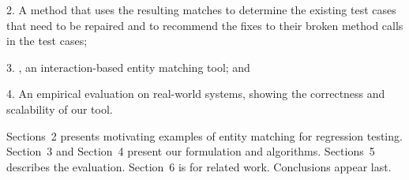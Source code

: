 2. A method that uses the resulting matches 
to determine the existing test cases that need to be repaired and to
recommend the fixes to their broken method calls in the test cases;



3. {\tool}, an interaction-based entity matching tool; and

4. An empirical evaluation on real-world systems, showing the
   correctness and scalability of our tool.

Sections~2 presents motivating examples of entity matching for
regression testing. Section~3 and Section~4 present our formulation
and algorithms. Sections~5 describes the evaluation. Section~6 is for
related work. Conclusions appear last.
